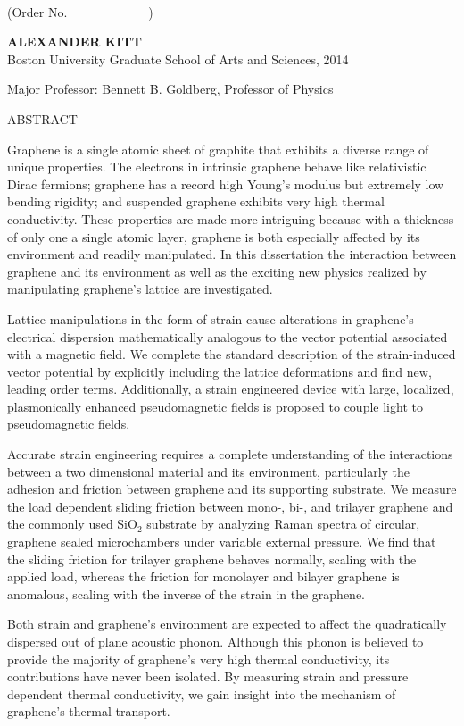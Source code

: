 \begin{center}

\textbf{\thesistitle}\\

(Order No.\ \ \ \ \ \ \ \ \ \ \ \ \ )

\textbf{ALEXANDER KITT}\\
Boston University Graduate School of Arts and Sciences, 2014\\
\begin{singlespace}
	Major Professor: Bennett B. Goldberg, Professor of Physics
\end{singlespace}

ABSTRACT

\end{center}
\vspace{-15 pt}  %

Graphene is a single atomic sheet of graphite that exhibits a diverse range of unique properties.
The electrons in intrinsic graphene behave like relativistic Dirac fermions; graphene has a record high Young's modulus but extremely low bending rigidity; and suspended graphene exhibits very high thermal conductivity.
These properties are made more intriguing because with a thickness of only one a single atomic layer, graphene is both especially affected by its environment and readily manipulated.
In this dissertation the interaction between graphene and its environment as well as the exciting new physics realized by manipulating graphene's lattice are investigated.

Lattice manipulations in the form of strain cause alterations in graphene's electrical dispersion mathematically analogous to the vector potential associated with a magnetic field.
We complete the standard description of the strain-induced vector potential by explicitly including the lattice deformations and find new, leading order terms.
Additionally, a strain engineered device with large, localized, plasmonically enhanced pseudomagnetic fields is proposed to couple light to pseudomagnetic fields.

Accurate strain engineering requires a complete understanding of the interactions between a two dimensional material and its environment, particularly the adhesion and friction between graphene and its supporting substrate.
We measure the load dependent sliding friction between mono-, bi-, and trilayer graphene and the commonly used SiO$_2$ substrate by analyzing Raman spectra of circular, graphene sealed microchambers under variable external pressure.
We find that the sliding friction for trilayer graphene behaves normally, scaling with the applied load, whereas the friction for monolayer and bilayer graphene is anomalous, scaling with the inverse of the strain in the graphene.

Both strain and graphene's environment are expected to affect the quadratically dispersed out of plane acoustic phonon.
Although this phonon is believed to provide the majority of graphene's very high thermal conductivity, its contributions have never been isolated.
By measuring strain and pressure dependent thermal conductivity, we gain insight into the mechanism of graphene's thermal transport. 

\newpage
